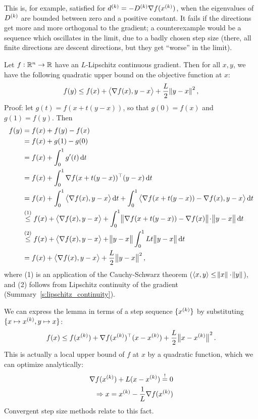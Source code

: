 \documentclass{article}
\begin{document}
This is, for example, satisfied for \(d^{(k)} = -D^{(k)}\nabla f(x^{(k)})\), when the eigenvalues of
\(D^{(k)}\) are bounded between zero and a positive constant.  It fails if the directions get more
and more orthogonal to the gradient; a counterexample would be a sequence which oscillates in the
limit, due to a badly chosen step size (there, all finite directions are descent directions, but
they get ``worse'' in the limit).


\label{s:descent_lemma}

Let \(f: \mathbb{R}^n \to \mathbb{R}\) have an \(L\)-Lipschitz continuous gradient.  Then for all \(x, y\), we
have the following quadratic upper bound on the objective function at \(x\):
\begin{equation*}
  f(y) \leq f(x) + \iprod{\nabla f(x)}{y - x} + \frac{L}{2}\enVert{y - x}^2,
\end{equation*}
Proof: let \(g(t) = f(x + t(y - x))\), so that \(g(0) = f(x)\) and \(g(1) = f(y)\). Then
\begin{align*}
  f(y) &= f(x) + f(y) - f(x) \\
       &= f(x) + g(1) - g(0) \\
       &= f(x) + \int_0^1 g'(t) \dif t \\
       &= f(x) + \int_0^1 \T{\nabla f(x + t(y - x))} (y - x) \dif t \\
       &= f(x) + \int_0^1 \iprod{\nabla f(x)}{y - x} \dif t
         + \int_0^1 \iprod{\nabla f(x + t(y - x)) - \nabla f(x)}{y - x} \dif t \\
       &\overset{(1)}{\leq} f(x) + \iprod{\nabla f(x)}{y - x}
         + \int_0^1 \enVert[1]{\nabla f(x + t(y - x)) - \nabla f(x)}\! \cdot \enVert[1]{y - x} \dif t \\
       &\overset{(2)}{\leq} f(x) + \iprod{\nabla f(x)}{y - x} + \enVert[1]{y - x} \int_0^1 Lt\enVert[1]{y - x} \dif t \\
       &= f(x) + \iprod{\nabla f(x)}{y - x} + \frac{L}{2}\enVert[1]{y - x}^2,
\end{align*}
where (1) is an application of the Cauchy-Schwarz theorem
(\(\langle x, y \rangle \leq \enVert{x} \cdot \enVert{y}\)), and (2) follows from Lipschitz
continuity of the gradient (Summary~\ref{s:lipschitz_continuity}).


\label{s:descent_lemma_interpretation}

We can express the lemma in terms of a step sequence \(\{x^{(k)}\}\) by substituting
\(\{x \mapsto x^{(k)}, y \mapsto x\}\):
\begin{equation*}
  f(x) \leq f(\kth{x}) + \T{\nabla f(\kth{x})}(x - \kth{x}) + \frac{L}{2}\enVert[1]{x - \kth{x}}^2.
\end{equation*}
This is actually a local upper bound of \(f\) at \(x\) by a quadratic function, which we can
optimize analytically:
\begin{gather*}
  \nabla f(x^{(k)}) + L (x - x^{(k)}) \overset{!}{=} 0\\
  \quad \Rightarrow x = x^{(k)} - \frac{1}{L} \nabla f(x^{(k)})
\end{gather*}
Convergent step size methods relate to this fact.
\end{document}

